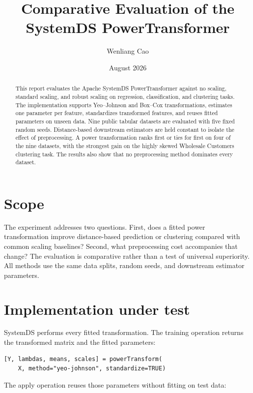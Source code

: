 \documentclass[11pt,a4paper]{article}
\title{Comparative Evaluation of the SystemDS PowerTransformer}
\author{Wenliang Cao}
\date{August 2026}
\begin{document}
\maketitle

\begin{abstract}
This report evaluates the Apache SystemDS PowerTransformer against no scaling,
standard scaling, and robust scaling on regression, classification, and
clustering tasks. The implementation supports Yeo--Johnson and Box--Cox
transformations, estimates one parameter per feature, standardizes transformed
features, and reuses fitted parameters on unseen data. Nine public tabular
datasets are evaluated with five fixed random seeds. Distance-based downstream
estimators are held constant to isolate the effect of preprocessing. A power
transformation ranks first or ties for first on four of the nine datasets, with
the strongest gain on the highly skewed Wholesale Customers clustering task.
The results also show that no preprocessing method dominates every dataset.
\end{abstract}

\tableofcontents
\newpage

\section{Scope}

The experiment addresses two questions. First, does a fitted power
transformation improve distance-based prediction or clustering compared with
common scaling baselines? Second, what preprocessing cost accompanies that
change? The evaluation is comparative rather than a test of universal
superiority. All methods use the same data splits, random seeds, and downstream
estimator parameters.

\section{Implementation under test}

SystemDS performs every fitted transformation. The training operation returns
the transformed matrix and the fitted parameters:

\begin{verbatim}
[Y, lambdas, means, scales] = powerTransform(
    X, method="yeo-johnson", standardize=TRUE)
\end{verbatim}

The apply operation reuses those parameters without fitting on test data:
\end{document}
